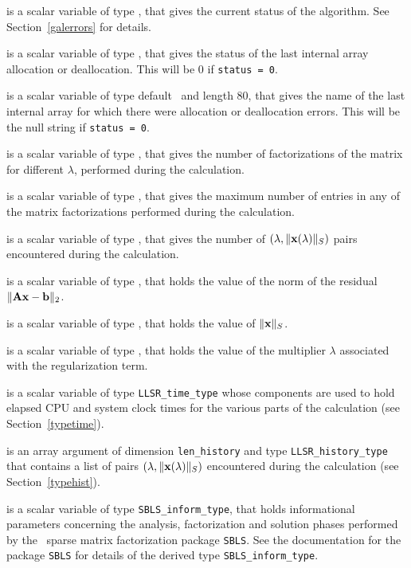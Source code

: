\documentclass{galahad}
\newcommand{\packagename}{LLSR}
\begin{document}
\begin{description}
 is a scalar variable of type \integer, that gives the
current status of the algorithm. See Section~\ref{galerrors} for details.

 is a scalar variable of type \integer,
that gives the status of the last internal array allocation
or deallocation. This will be 0 if {\tt status = 0}.

 is a scalar variable of type default \character\
and length 80, that  gives the name of the last internal array
for which there were allocation or deallocation errors.
This will be the null string if {\tt status = 0}.

 is a scalar variable of type \integer, that
gives the number of factorizations of the matrix \req{kkt}
for different $\lambda$, performed during the calculation.

 is a scalar variable of type \integer, that
gives the maximum number of entries in any of the matrix factorizations
performed during the calculation.

 is a scalar variable of type \integer, that gives
the number of $(\lambda,\|{\mathbf{x}}(\lambda)\|_S)$ pairs encountered during the
calculation.

 is a scalar variable of type \realdp, that holds the
value of the norm of the residual $\| {\mathbf{A}} {\mathbf{x}} - {\mathbf{b}}\|_2$.

 is a scalar variable of type \realdp,
that holds the value of $\|{\mathbf{x}}\|_S$.

 is a scalar variable of type \realdp, that holds the
value of the multiplier $\lambda$ associated with the 
regularization term.

 is a scalar variable of type {\tt \packagename\_time\_type}
whose components are used to hold elapsed CPU  and system clock times for the
various parts of the calculation (see Section~\ref{typetime}).

 is an array argument of dimension {\tt len\_history} and
type {\tt \packagename\_history\_type} that contains a list of pairs
$(\lambda,\|{\mathbf{x}}(\lambda)\|_S)$ encountered during the
calculation (see Section~\ref{typehist}).

 is a scalar variable of type {\tt SBLS\_inform\_type},
that holds informational parameters concerning the analysis, factorization
and solution phases performed by
the \galahad\ sparse matrix factorization package {\tt SBLS}.
See the documentation for the package {\tt SBLS} for details of the
derived type {\tt SBLS\_inform\_type}.


\end{description}
\end{document}
